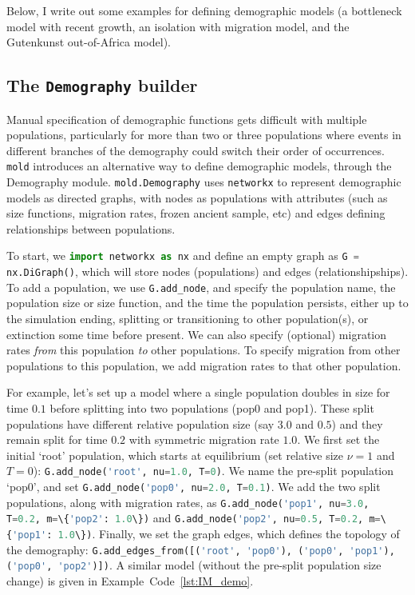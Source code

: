 \documentclass[10pt]{article}
\makeatletter
\newcommand{\mold}{\texttt{mold}\xspace}
\newcommand{\py}[1]{\lstinline[breaklines=true,language=Python, showstringspaces=False]@#1@}
\makeatother
\begin{document}
Below, I write out some examples for defining demographic models (a bottleneck model with recent growth, an isolation with migration model, and the Gutenkunst out-of-Africa model).

\subsection{The \texttt{Demography} builder}

Manual specification of demographic functions gets difficult with multiple populations, particularly for more than two or three populations where events in different branches of the demography could switch their order of occurrences.
\mold introduces an alternative way to define demographic models, through the Demography module.
\py{mold.Demography} uses \py{networkx} to represent demographic models as directed graphs, with nodes as populations with attributes (such as size functions, migration rates, frozen ancient sample, etc) and edges defining relationships between populations.

To start, we \py{import networkx as nx} and define an empty graph as \py{G = nx.DiGraph()}, which will store nodes (populations) and edges (relationshipships).
To add a population, we use \py{G.add_node}, and specify the population name, the population size or size function, and the time the population persists, either up to the simulation ending, splitting or transitioning to other population(s), or extinction some time before present.
We can also specify (optional) migration rates \emph{from} this population \emph{to} other populations.
To specify migration from other populations to this population, we add migration rates to that other population.

For example, let's set up a model where a single population doubles in size for time $0.1$ before splitting into two populations (pop0 and pop1).
These split populations have different relative population size (say $3.0$ and $0.5$) and they remain split for time $0.2$ with symmetric migration rate $1.0$.
We first set the initial `root' population, which starts at equilibrium (set relative size $\nu=1$ and $T=0$): \py{G.add_node('root', nu=1.0, T=0)}.
We name the pre-split population `pop0', and set \py{G.add_node('pop0', nu=2.0, T=0.1)}.
We add the two split populations, along with migration rates, as \py{G.add_node('pop1', nu=3.0, T=0.2, m=\{'pop2': 1.0\})} and \py{G.add_node('pop2', nu=0.5, T=0.2, m=\{'pop1': 1.0\})}.
Finally, we set the graph edges, which defines the topology of the demography: \py{G.add_edges_from([('root', 'pop0'), ('pop0', 'pop1'), ('pop0', 'pop2')])}.
A similar model (without the pre-split population size change) is given in Example~Code~\ref{lst:IM_demo}.
\end{document}
